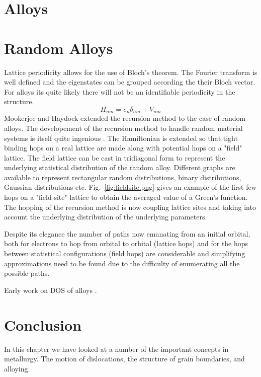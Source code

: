 \section{Alloys}

\cite{glaser81}
\section{Random Alloys}
Lattice periodicity allows for the use of Bloch's theorem. The Fourier transform
is well defined and the eigenstates can be grouped according the their Bloch vector.
For alloys its quite likely there will not be an identifiable periodicity in 
the structure.
%
\begin{equation}
H_{nm} = e_{n}\delta_{nm} + V_{nm}
\end{equation}
%
Mookerjee and Haydock extended the recursion method to the case of random alloys.
The developement of the recursion method to handle random material systems is 
itself quite ingenious \cite{mookerjee, haydock74}. The Hamiltonian is extended
so that tight binding hops on a real lattice are made along with potential hops
on a "field" lattice. The field lattice can be cast in tridiagonal form to represent
the underlying statistical distribution of the random alloy. Different graphs are available
to represent rectangular random distributions, binary distributions, Gaussian distributions
etc. Fig.~\ref{fig:fieldsite.png} gives an example of the first few hops on a "field-site" 
lattice to obtain the averaged value of a Green's function. The hopping of the recursion method
is now coupling lattice sites and taking into account the underlying distribution of 
the underlying parameters.

Despite its elegance the number of paths now emanating from an initial orbital, both
for electrons to hop from orbital to orbital (lattice hops) and for the hops between 
statistical configurations (field hops) are considerable and simplifying approximations 
need to be found due to the difficulty of enumerating all the possible paths.

Early work on DOS of alloys \cite{cubiotti77}. 

\section{Conclusion}
In this chapter we have looked at a number of the important concepts
in metallurgy. The motion of dislocations, 
the structure of grain boundaries, and alloying. 


